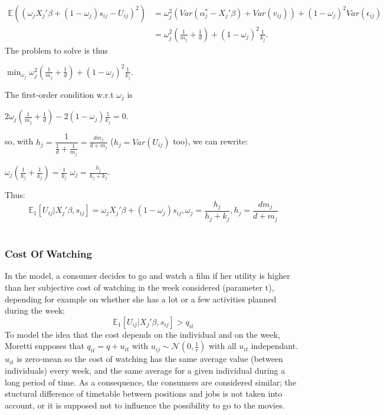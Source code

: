 	\begin{align*}
	\mathbb{E}((\omega_{j} X_{j}'\beta+(1-\omega_{j})s_{i j}-U_{i j})^2)&=\omega_{j}^{2}(Var(\alpha_{j}^{*}-X_{j}'\beta)+Var(v_{i j}))+(1-\omega_{j})^{2}Var(\epsilon_{i j})\\
	&=\omega_{j}^{2}\left(\frac{1}{m_{j}}+\frac{1}{d}\right)+(1-\omega_{j})^{2}\frac{1}{k_{j}}.
	\end{align*}
	The problem to solve is thus
	\begin{center}
		$\min_{\omega_{j}} \omega_{j}^{2}(\frac{1}{m_{j}}+\frac{1}{d})+(1-\omega_{j})^{2}\frac{1}{k_{j}}$.
	\end{center}
	The first-order condition w.r.t $\omega_{j}$ is 
	\begin{center}
		$2\omega_{j}(\frac{1}{m_{j}}+\frac{1}{d})-2(1-\omega_{j})\frac{1}{k_{j}}=0$.
	\end{center}
	so, with $h_{j}=\dfrac{1}{\frac{1}{d}+\frac{1}{m_{j}}}=\frac{d m_{j}}{d+m_{j}}$ ($h_{j}=Var(U_{i j})$ too), we can rewrite:
	\begin{center}
		$\omega_{j}(\frac{1}{h_{j}}+\frac{1}{k_{j}})=\frac{1}{k_{j}}$
		$\omega_j=\frac{h_{j}}{h_{j}+k_{j}}$.
	\end{center}
	Thus:
	\begin{equation}
	\mathbb{E}_1[U_{i j}|X_{j}'\beta, s_{i j}]=\omega_{j} X_{j}'\beta+(1-\omega_{j})s_{i j}, \omega_j=\frac{h_{j}}{h_{j}+k_{j}}, h_{j}=\frac{d m_{j}}{d+m_{j}}
	\end{equation}
	\\
	\subsubsection{Cost Of Watching}
	In the model, a consumer decides to go and watch a film if her utility is higher than her subjective cost of watching in the week considered (parameter t), depending for example on whether she has a lot or a few activities planned during the week: 
	\begin{equation}
	\mathbb{E}_1[U_{i j}|X_{j}'\beta, s_{i j}]>q_{i t}
	\end{equation}
	To model the idea that the cost depends on the individual and on the week, Moretti supposes that $q_{i t}=q+u_{i t}$ with $u_{i j}\sim \mathcal{N}(0,\frac{1}{r})$ with all $u_{i t}$ independant. $u_{i t}$ is zero-mean so the cost of watching has the same average value (between individuals) every week, and the same average for a given individual during a long period of time. As a consequence, the consumers are considered similar; the stuctural difference of timetable between positions and jobs is not taken into account, or it is supposed not to influence the possibility to go to the movies.\\
	\\
